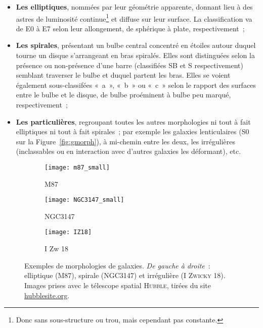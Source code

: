 \documentclass[../main/main.tex]{subfiles}
\begin{document}
\begin{itemize}
    \item \textbf{Les elliptiques}, nommées par leur géométrie apparente,
        donnant lieu à des astres de luminosité continue\footnote{Donc sans
        sous-structure ou trou, mais cependant pas constante.} et diffuse sur
        leur surface. La classification va de E0 à E7 selon leur allongement, de
        sphérique à plate, respectivement~;
    \item \textbf{Les spirales}, présentant un bulbe central concentré en
        étoiles autour duquel tourne un disque s'arrangeant en bras spiralés.
        Elles sont distinguées selon la présence ou non-présence d'une barre
        (classifiées SB et S respectivement) semblant traverser le bulbe et
        duquel partent les bras. Elles se voient également sous-classifées
        «~a~», «~b~» ou «~c~» selon le rapport des surfaces entre le bulbe et le
        disque, de bulbe proéminent à bulbe peu marqué, respectivement~;
    \item \textbf{Les particulières}, regroupant toutes les autres morphologies
        ni tout à fait elliptiques ni tout à fait spirales~; par exemple les
        galaxies lenticulaires (S0 sur la Figure~\ref{fig:gmorph}), à mi-chemin
        entre les deux, les irrégulières (inclassables ou en interaction avec
        d'autres galaxies les déformant), etc.
\end{itemize}

\begin{figure}[t]
    \centering
    \begin{subfigure}[c]{.32\linewidth}
        \centering
        \texttt{[image: m87\_small]}
        \captionsetup{justification=centering}
        \caption{M87}
        \label{fig:m87}
    \end{subfigure}
    \hfill
    \begin{subfigure}[c]{.32\linewidth}
        \centering
        \texttt{[image: NGC3147\_small]}
        \captionsetup{justification=centering}
        \caption{NGC3147}
        \label{fig:ngc3147}
    \end{subfigure}
    \hfill
    \begin{subfigure}[c]{.32\linewidth}
        \centering
        \texttt{[image: IZ18]}
        \captionsetup{justification=centering}
        \caption{I Zw 18}
        \label{fig:iz18}
    \end{subfigure}
    \caption[Exemples de morphologies de galaxies]{Exemples de morphologies de
        galaxies. \textit{De gauche à droite}~: elliptique (M87), spirale
        (NGC3147) et irrégulière (I \textsc{Zwicky} 18). Images prises avec le
        télescope spatial \textsc{Hubble}, tirées
    du site \href{https://hubblesite.org}{hubblesite.org}.}
    \label{fig:gpict}
\end{figure}
\end{document}
